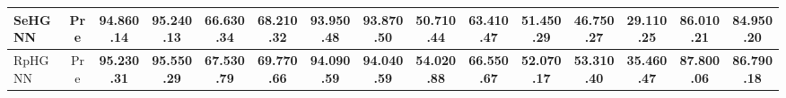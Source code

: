 \documentclass[lettersize,journal]{IEEEtran}
\begin{document}
\begin{table*}[!tp]
{\begin{tabular}{l c c c c c c c c c c c c c c}
SeHGNN 
               & Pre     &  94.860.14 & 95.240.13 & 66.630.34 & 68.210.32 & 93.950.48 & 93.870.50 & 50.710.44 & 63.410.47 & 51.450.29 & 46.750.27 
                                                                                                                                                                                    & 29.110.25 
                                                                                                                                                                                        & 86.010.21 
                                                                                                                                                                                            & 84.950.20\\\hline
RpHGNN 
                & Pre     & \textbf{95.230.31} 
                                           & \textbf{95.550.29}
                                                            & \textbf{67.530.79}     
                                                                             & \textbf{69.770.66}   
                                                                                              &  \textbf{94.090.59} 
                                                                                                               & \textbf{94.040.59} 
                                                                                                                                & \textbf{54.020.88}    
                                                                                                                                                & \textbf{66.550.67} 
                                                                                                                                                            & \textbf{52.070.17} 
                                                                                                                                                                    & \textbf{53.310.40} 
                                                                                                                                                                                            & \textbf{35.460.47}
                                                                                                                  & \textbf{87.800.06}
                                                                                                                        & \textbf{86.790.18}\\\hline

\end{tabular}
}
\label{tab:performance}

\end{table*}
\end{document}
